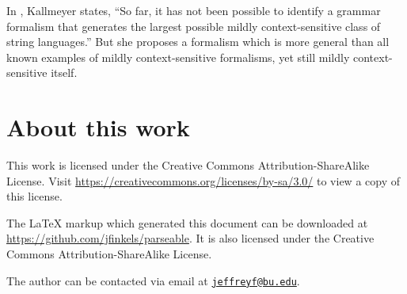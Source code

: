 \documentclass[draft]{article}
\theoremstyle{remark} \newtheorem{technicality}{Technical note}
\theoremstyle{definition} \newtheorem{definition}{Definition}
\theoremstyle{definition} \newtheorem{openproblem}{Open problem}
\newcommand{\email}[1]{\href{mailto:#1}{\nolinkurl{#1}}} %
\begin{document}
In \cite{kallmeyer}, Kallmeyer states, ``So far, it has not been possible to identify a grammar formalism that generates the largest possible mildly context-sensitive class of string languages.''
But she proposes a formalism which is more general than all known examples of mildly context-sensitive formalisms, yet still mildly context-sensitive itself.

\section{About this work}

This work is licensed under the Creative Commons Attribution-ShareAlike License.
Visit \mbox{\url{https://creativecommons.org/licenses/by-sa/3.0/}} to view a copy of this license.

The \LaTeX{} markup which generated this document can be downloaded at \mbox{\url{https://github.com/jfinkels/parseable}}.
It is also licensed under the Creative Commons Attribution-ShareAlike License.

The author can be contacted via email at \email{jeffreyf@bu.edu}.
\end{document}
